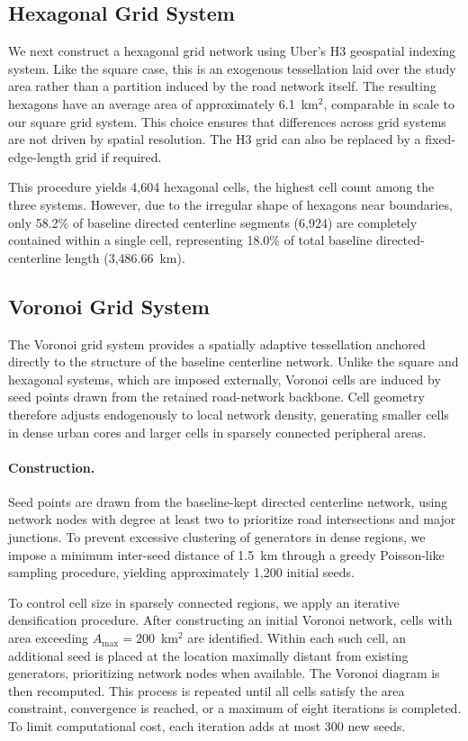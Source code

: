 \documentclass[12pt]{article}
\begin{document}
	\subsection{Hexagonal Grid System}
	
	We next construct a hexagonal grid network using Uber's H3 geospatial indexing system. Like the square case, this is an exogenous tessellation laid over the study area rather than a partition induced by the road network itself. The resulting hexagons have an average area of approximately 6.1~km$^2$, comparable in scale to our square grid system. This choice ensures that differences across grid systems are not driven by spatial resolution. The H3 grid can also be replaced by a fixed-edge-length grid if required.
	
	This procedure yields 4,604 hexagonal cells, the highest cell count among the three systems. However, due to the irregular shape of hexagons near boundaries, only 58.2\% of baseline directed centerline segments (6,924) are completely contained within a single cell, representing 18.0\% of total baseline directed-centerline length (3,486.66~km).
	
	\subsection{Voronoi Grid System}
	
	The Voronoi grid system provides a spatially adaptive tessellation anchored directly to the structure of the baseline centerline network. Unlike the square and hexagonal systems, which are imposed externally, Voronoi cells are induced by seed points drawn from the retained road-network backbone. Cell geometry therefore adjusts endogenously to local network density, generating smaller cells in dense urban cores and larger cells in sparsely connected peripheral areas.
	
	\paragraph{Construction.}
	Seed points are drawn from the baseline-kept directed centerline network, using network nodes with degree at least two to prioritize road intersections and major junctions. To prevent excessive clustering of generators in dense regions, we impose a minimum inter-seed distance of 1.5~km through a greedy Poisson-like sampling procedure, yielding approximately 1,200 initial seeds.
	
	To control cell size in sparsely connected regions, we apply an iterative densification procedure. After constructing an initial Voronoi network, cells with area exceeding $A_{\max}=200$~km$^2$ are identified. Within each such cell, an additional seed is placed at the location maximally distant from existing generators, prioritizing network nodes when available. The Voronoi diagram is then recomputed. This process is repeated until all cells satisfy the area constraint, convergence is reached, or a maximum of eight iterations is completed. To limit computational cost, each iteration adds at most 300 new seeds.
	
\end{document}
